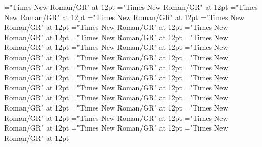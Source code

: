 \documentclass[a4paper]{article}
\begin{document}
\pagestyle{plain}
\sloppy
\setlength{\parfillskip}{0pt plus 1fil}
\font{}="Times New Roman/GR" at 12pt
\font{}="Times New Roman/GR" at 12pt
\font{}="Times New Roman/GR" at 12pt
\font\entryletDatadicBody="Times New Roman/GR" at 12pt
\font\headwordsehentryletDatadicBody="Times New Roman/GR" at 12pt
\font\xhomographnumberptheadwordsehentryletDatadicBody="Times New Roman/GR" at 12pt
\font\sensesentryletDatadicBody="Times New Roman/GR" at 12pt
\font\sensesensesentryletDatadicBody="Times New Roman/GR" at 12pt
\font\xsensenumberLcensensesensesentryletDatadicBody="Times New Roman/GR" at 12pt
\font\grammaticalinfosensesensesentryletDatadicBody="Times New Roman/GR" at 12pt
\font\partofspeechptgrammaticalinfosensesensesentryletDatadicBody="Times New Roman/GR" at 12pt
\font\slotsgrammaticalinfosensesensesentryletDatadicBody="Times New Roman/GR" at 12pt
\font\xitemslotsgrammaticalinfosensesensesentryletDatadicBody="Times New Roman/GR" at 12pt
\font\slotnameptxitemslotsgrammaticalinfosensesensesentryletDatadicBody="Times New Roman/GR" at 12pt
\font{}="Times New Roman/GR" at 12pt
\font\xitemptdefinitionLbptsensesensesentryletDatadicBody="Times New Roman/GR" at 12pt
\font\xlanguagetagenxitemptdefinitionLbptsensesensesentryletDatadicBody="Times New Roman/GR" at 12pt
\font\xitemendefinitionLbptsensesensesentryletDatadicBody="Times New Roman/GR" at 12pt
\font\xlanguagetagenxitemendefinitionLbptsensesensesentryletDatadicBody="Times New Roman/GR" at 12pt
\font\slotnameptslotsgrammaticalinfosensesensesentryletDatadicBody="Times New Roman/GR" at 12pt
\font\relationantonymptsensesensesentryletDatadicBody="Times New Roman/GR" at 12pt
\font\relationantonymbeforesensesensesentryletDatadicBody="Times New Roman/GR" at 12pt
\font\xitemptrelationantonymptsensesensesentryletDatadicBody="Times New Roman/GR" at 12pt
\font\xlanguagetagenxitemptrelationantonymptsensesensesentryletDatadicBody="Times New Roman/GR" at 12pt
\font\xitemenrelationantonymptsensesensesentryletDatadicBody="Times New Roman/GR" at 12pt
\font\xlanguagetagenxitemenrelationantonymptsensesensesentryletDatadicBody="Times New Roman/GR" at 12pt
\font\xsensenumberLbensensesensesentryletDatadicBody="Times New Roman/GR" at 12pt

\mbox{} 
\newpage 
\newpage 
\setcounter{page}{1} 
\pagestyle{fancy} 

\end{document}
